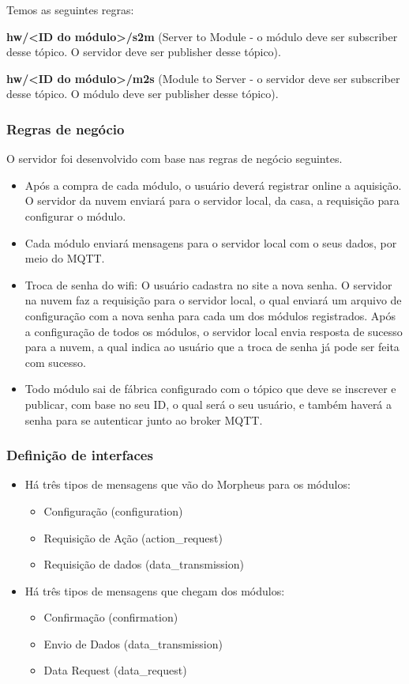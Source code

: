 Temos as seguintes regras:

\textbf{hw/\textless ID do módulo\textgreater /s2m} (Server to Module - o módulo deve ser subscriber desse tópico. O servidor deve ser publisher desse tópico).

\textbf{hw/\textless ID do módulo\textgreater /m2s} (Module to Server - o servidor deve ser subscriber desse tópico. O módulo deve ser publisher desse tópico).

\subsubsection{Regras de negócio}
O servidor foi desenvolvido com base nas regras de negócio seguintes.
\begin{itemize}
\item Após a compra de cada módulo, o usuário deverá registrar online a aquisição. O servidor da nuvem enviará para o servidor local, da casa, a requisição para configurar o módulo.
\item Cada módulo enviará mensagens para o servidor local com o seus dados, por meio do MQTT.
\item Troca de senha do wifi: O usuário cadastra no site a nova senha. O servidor na nuvem faz a requisição para o servidor local, o qual enviará um arquivo de configuração com a nova senha para cada um dos módulos registrados. Após a configuração de todos os módulos, o servidor local envia resposta de sucesso para a nuvem, a qual indica ao usuário que a troca de senha já pode ser feita com sucesso.
\item Todo módulo sai de fábrica configurado com o tópico que deve se inscrever e publicar, com base no seu ID, o qual será o seu usuário, e também haverá a senha para se autenticar junto ao broker MQTT.
\end{itemize}

\subsubsection{Definição de interfaces}
\begin{itemize}
\item Há três tipos de mensagens que vão do Morpheus para os módulos:
  \begin{itemize}
  \item Configuração (configuration)
  \item Requisição de Ação (action\_request)
  \item Requisição de dados (data\_transmission)
  \end{itemize}
\item Há três tipos de mensagens que chegam dos módulos:
  \begin{itemize}
  \item Confirmação (confirmation)
  \item Envio de Dados (data\_transmission)
  \item Data Request (data\_request)
  \end{itemize}
\end{itemize}

